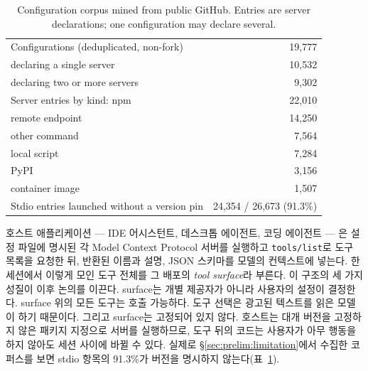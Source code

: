 \documentclass[acmsmall,screen,review,anonymous]{acmart}
\begin{document}
\begin{table}[h]
\caption{Configuration corpus mined from public GitHub. Entries are server declarations; one configuration may declare several.}
\label{tab:corpus}
\begin{tabular}{lr}
\toprule
Configurations (deduplicated, non-fork) & 19,777 \\
\quad declaring a single server & 10,532 \\
\quad declaring two or more servers & 9,302 \\
\midrule
Server entries by kind: npm & 22,010 \\
\quad remote endpoint & 14,250 \\
\quad other command & 7,564 \\
\quad local script & 7,284 \\
\quad PyPI & 3,156 \\
\quad container image & 1,507 \\
\midrule
Stdio entries launched without a version pin & 24,354 / 26,673 (91.3\%) \\
\bottomrule
\end{tabular}
\end{table}

호스트 애플리케이션 --- IDE 어시스턴트, 데스크톱 에이전트, 코딩 에이전트 --- 은 설정 파일에 명시된 각 Model Context Protocol 서버를 실행하고 \texttt{tools/list}로 도구 목록을 요청한 뒤, 반환된 이름과 설명, JSON 스키마를 모델의 컨텍스트에 넣는다. 한 세션에서 이렇게 모인 도구 전체를 그 배포의 \emph{tool surface}라 부른다. 이 구조의 세 가지 성질이 이후 논의를 이끈다. surface는 개별 제공자가 아니라 사용자의 설정이 결정한다. surface 위의 모든 도구는 호출 가능하다. 도구 선택은 광고된 텍스트를 읽은 모델이 하기 때문이다. 그리고 surface는 고정되어 있지 않다. 호스트는 대개 버전을 고정하지 않은 패키지 지정으로 서버를 실행하므로, 도구 뒤의 코드는 사용자가 아무 행동을 하지 않아도 세션 사이에 바뀔 수 있다. 실제로 \S\ref{sec:prelim:limitation}에서 수집한 코퍼스를 보면 stdio 항목의 91.3\%가 버전을 명시하지 않는다(표~\ref{tab:corpus}).
\end{document}
